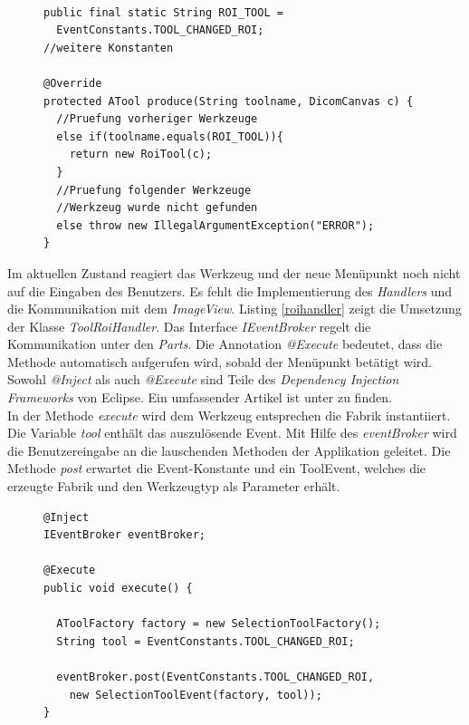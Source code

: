 \begin{figure}[htbp]
\begin{lstlisting}[frame=leftline]

public final static String ROI_TOOL = 
  EventConstants.TOOL_CHANGED_ROI;
//weitere Konstanten

@Override
protected ATool produce(String toolname, DicomCanvas c) {
  //Pruefung vorheriger Werkzeuge
  else if(toolname.equals(ROI_TOOL)){
    return new RoiTool(c);
  }
  //Pruefung folgender Werkzeuge
  //Werkzeug wurde nicht gefunden
  else throw new IllegalArgumentException("ERROR");
}
\end{lstlisting}
\end{figure}

Im aktuellen Zustand reagiert das Werkzeug und der neue Menüpunkt noch nicht auf die Eingaben des Benutzers. Es fehlt die Implementierung des \textit{Handlers} und die Kommunikation mit dem \textit{ImageView}. Listing \ref{roihandler} zeigt die Umsetzung der Klasse \textit{ToolRoiHandler}. Das Interface \textit{IEventBroker} regelt die Kommunikation unter den \textit{Parts}. Die Annotation \textit{@Execute} bedeutet, dass die Methode automatisch aufgerufen wird, sobald der Menüpunkt betätigt wird. Sowohl \textit{@Inject} als auch \textit{@Execute} sind Teile des \textit{Dependency Injection Frameworks} von Eclipse. Ein umfassender Artikel ist unter \cite{vogel:di} zu finden.\\
In der Methode \textit{execute} wird dem Werkzeug entsprechen die Fabrik instantiiert. Die Variable \textit{tool} enthält das auszulösende Event. Mit Hilfe des \textit{eventBroker} wird die Benutzereingabe an die lauschenden Methoden der Applikation geleitet. Die Methode \textit{post} erwartet die Event-Konstante und ein ToolEvent, welches die erzeugte Fabrik und den Werkzeugtyp als Parameter erhält.

\begin{figure}[htbp]
\begin{lstlisting}[frame=leftline]
@Inject
IEventBroker eventBroker;

@Execute
public void execute() {

  AToolFactory factory = new SelectionToolFactory();
  String tool = EventConstants.TOOL_CHANGED_ROI;

  eventBroker.post(EventConstants.TOOL_CHANGED_ROI,
    new SelectionToolEvent(factory, tool));
}
\end{lstlisting}
\end{figure}

